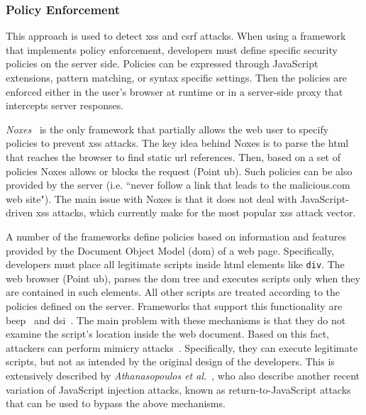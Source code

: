 \documentclass[conference]{IEEEtran}
\begin{document}
\subsubsection{Policy Enforcement}
\label{sec:policy}

This approach is used to detect {\sc xss} and {\sc csrf} attacks. When
using a framework that implements policy enforcement, developers must
define specific security policies on the server side. Policies can be
expressed through JavaScript extensions, pattern matching, or syntax
specific settings. Then the policies are enforced either in the user's
browser at runtime or in a server-side proxy that intercepts server
responses.

{\it Noxes}~\cite{KKVJ06,KJKV09} is the only
framework that partially allows the web
user to specify policies to prevent {\sc xss} attacks.
The key idea behind Noxes is to parse
the {\sc html} that reaches the browser to
find static {\sc url} references. Then, based on
a set of policies Noxes allows or blocks
the request (Point {\sc ub}). Such policies
can be also provided by the server (i.e. ``never
follow a link that leads to the malicious.com
web site"). The main issue with Noxes is that
it does not deal with JavaScript-driven {\sc xss}
attacks, which currently make for the most popular
{\sc xss} attack vector.

A number of the frameworks define policies based on information and
features provided by the Document Object Model ({\sc dom}) of a web
page. Specifically, developers must place all legitimate scripts
inside {\sc html} elements like {\tt div}. The web browser (Point {\sc
  ub}), parses the {\sc dom} tree and executes scripts only when they
are contained in such elements. All other scripts are treated
according to the policies defined on the server. Frameworks that
support this functionality are {\sc beep}~\cite{TNH07} and {\sc
  dsi}~\cite{NSS06}. The main problem with these mechanisms is that
they do not examine the script's location inside the web document.
Based on this fact, attackers can perform mimicry attacks~\cite{WS02}.
Specifically, they can execute legitimate scripts, but not as intended
by the original design of the developers. This is extensively
described by {\it Athanasopoulos et al.}~\cite{APKLM10}, who also describe
another recent variation of JavaScript injection attacks, known as
return-to-JavaScript attacks that can be used to bypass the above
mechanisms.
\end{document}
